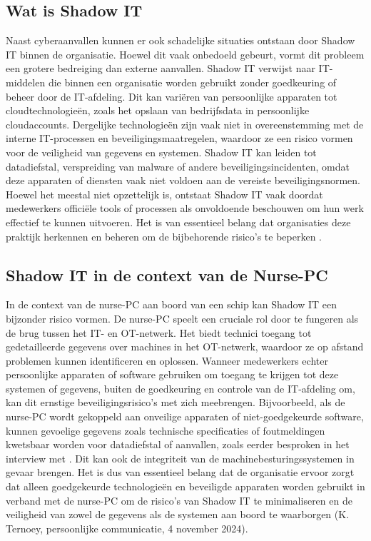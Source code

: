 \subsection{Wat is Shadow IT}
Naast cyberaanvallen kunnen er ook schadelijke situaties ontstaan door Shadow IT binnen de organisatie. Hoewel dit vaak onbedoeld gebeurt, vormt dit probleem een 
grotere bedreiging dan externe aanvallen. Shadow IT verwijst naar IT-middelen die binnen een organisatie worden gebruikt zonder goedkeuring of beheer door de IT-afdeling. 
Dit kan variëren van persoonlijke apparaten tot cloudtechnologieën, zoals het opslaan van bedrijfsdata in persoonlijke cloudaccounts. Dergelijke technologieën zijn vaak niet in 
overeenstemming met de interne IT-processen en beveiligingsmaatregelen, waardoor ze een risico vormen voor de veiligheid van gegevens en systemen. Shadow IT kan leiden tot datadiefstal, 
verspreiding van malware of andere beveiligingsincidenten, omdat deze apparaten of diensten vaak niet voldoen aan de vereiste beveiligingsnormen. Hoewel het meestal niet opzettelijk is, 
ontstaat Shadow IT vaak doordat medewerkers officiële tools of processen als onvoldoende beschouwen om hun werk effectief te kunnen uitvoeren. Het is van essentieel belang dat organisaties 
deze praktijk herkennen en beheren om de bijbehorende risico’s te beperken \autocite{NCSC2023}.

\subsection{Shadow IT in de context van de Nurse-PC}
In de context van de nurse-PC aan boord van een schip kan Shadow IT een bijzonder risico vormen. De nurse-PC speelt een cruciale rol door te fungeren als de brug 
tussen het IT- en OT-netwerk. Het biedt technici toegang tot gedetailleerde gegevens over machines in het OT-netwerk, waardoor ze op afstand problemen kunnen 
identificeren en oplossen. Wanneer medewerkers echter persoonlijke apparaten of software gebruiken om toegang te krijgen tot deze systemen of gegevens, buiten de 
goedkeuring en controle van de IT-afdeling om, kan dit ernstige beveiligingsrisico's met zich meebrengen. Bijvoorbeeld, als de nurse-PC wordt gekoppeld aan onveilige 
apparaten of niet-goedgekeurde software, kunnen gevoelige gegevens zoals technische specificaties of foutmeldingen kwetsbaar worden voor datadiefstal of aanvallen, zoals eerder besproken in het interview met \textcite{Hecker2021}.
Dit kan ook de integriteit van de machinebesturingssystemen in gevaar brengen. Het is dus van essentieel belang dat de organisatie ervoor zorgt dat alleen goedgekeurde 
technologieën en beveiligde apparaten worden gebruikt in verband met de nurse-PC om de risico's van Shadow IT te minimaliseren en de veiligheid van zowel de gegevens 
als de systemen aan boord te waarborgen (K. Ternoey, persoonlijke communicatie, 4 november 2024).

